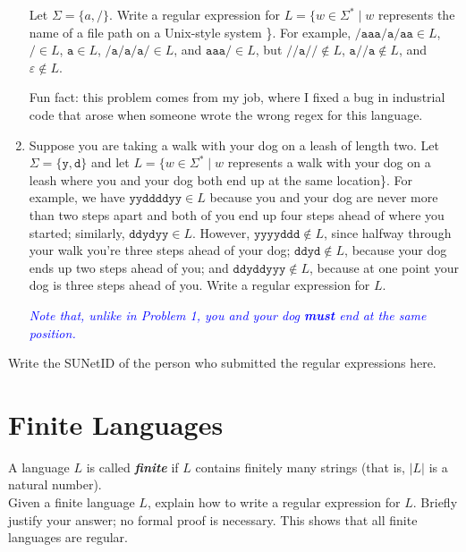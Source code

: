 \documentclass{article}
\renewcommand{\(}{\left(}
\renewcommand{\)}{\right)}
\theoremstyle{plain}
\theoremstyle{plain}
\theoremstyle{definition}
\renewcommand{\emph}[1]{\textit{\textbf{#1}}}
\newcommand{\annotate}[1]{\textit{\textcolor{blue}{#1}}}
\newcommand{\ttt}[1]{\texttt{#1}}
\begin{document}
\begin{enumerate}[label*=\roman*.,ref=\roman*]
    Let $\Sigma = \{a,/\}$. Write a regular expression for $L = \{w \in \Sigma^* \mid w$ represents the name of a file path on a Unix-style system \}. For example, $\ttt{/aaa/a/aa} \in L$, $\ttt{/} \in L$, $\ttt{a} \in L$, $\ttt{/a/a/a/} \in L$, and $\ttt{aaa/} \in L$, but $\ttt{//a//} \notin L$, $\ttt{a//a} \notin L$, and $\varepsilon \notin L$.
    
    Fun fact: this problem comes from my job, where I fixed a bug in industrial code that arose when someone wrote the wrong regex for this language. 
    
    \item Suppose you are taking a walk with your dog on a leash of length two. Let $\Sigma = \{\ttt{y}, \ttt{d}\}$ and let  $L = \{w \in \Sigma^* \mid w$ represents a walk with your dog on a leash where you and your dog both end up at the same location\}. For example, we have $\ttt{yyddddyy} \in L$ because you and your dog are never more than two steps apart and both of you end up four steps ahead of where you started; similarly, $\ttt{ddydyy} \in L$. However, $\ttt{yyyyddd} \notin L$, since halfway through your walk you're three steps ahead of your dog; $\ttt{ddyd} \notin L$, because your dog ends up two steps ahead of you; and $\ttt{ddyddyyy} \notin L$, because at one point your dog is three steps ahead of you. Write a regular expression for $L$.
    
    \annotate{Note that, unlike in Problem 1, you and your dog \textbf{must} end at the same position.}
    
\end{enumerate}
\begin{shaded}
Write the SUNetID of the person who submitted the regular expressions here. 
\end{shaded}

\pagebreak

\section{Finite Languages}

A language $L$ is called \emph{finite} if $L$ contains finitely many strings (that is, $|L|$ is a natural number). \\

Given a finite language $L$, explain how to write a regular expression for $L$. Briefly justify your answer; no formal proof is necessary. This shows that all finite languages are regular. \\
    
\end{document}
